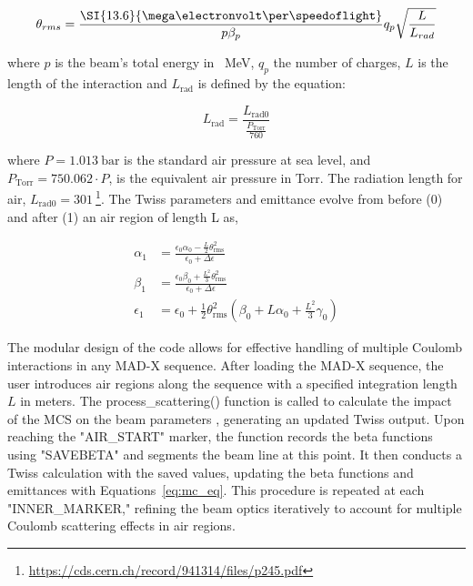\documentclass[a4paper,
               biblatex,     %
               ]{jacow}
\begin{document}
\[
\theta_{rms} = \frac{\SI{13.6}{\mega\electronvolt\per\speedoflight}}{p\beta_{p}}q_{p}\sqrt\frac{L}{L_{rad}}\]

\noindent where $p$ is the beam's total energy in \SI{}{\mega\electronvolt}, $q_{p}$ the number of charges, $L$ is the length of the interaction and $L_{\text{rad}}$ is defined by the equation:

\[
L_{\text{rad}} = \frac{L_{\text{rad0}}}{\frac{P_{\text{Torr}}}{760}}
\]

\noindent where $P=\SI{1.013}{\bar}$ is the standard air pressure at sea level, and $P_{\text{Torr}} = 750.062\cdot P$, is the equivalent air pressure in Torr. The radiation length for air, $L_{\text{rad0}}=\SI{301}{}$\footnote{\href{https://cds.cern.ch/record/941314/files/p245.pdf}{{https://cds.cern.ch/record/941314/files/p245.pdf}}}. The Twiss parameters and emittance evolve from before (0) and after (1) an air region of length L as,


\begin{equation}
\label{eq:mc_eq}
\begin{aligned}
\alpha_{1} &= \frac{\epsilon_0 \alpha_0 - \frac{L}{2} \theta_{\text{rms}}^2}{\epsilon_0 + \Delta \epsilon}\\
\beta_{1} &= \frac{\epsilon_0 \beta_0 + \frac{L^2}{3} \theta_{\text{rms}}^2}{\epsilon_0 + \Delta \epsilon}\\
\epsilon_{1} &= \epsilon_0 + \frac{1}{2} \theta_{\text{rms}}^2 \left( \beta_0 + L \alpha_0 + \frac{L^2}{3} \gamma_0 \right)
\end{aligned}
\end{equation}

The modular design of the code allows for effective handling of multiple Coulomb interactions in any MAD-X sequence. After loading the MAD-X sequence, the user introduces air regions along the sequence with a specified integration length $L$ in meters. The process\_scattering() function is called to calculate the impact of the MCS on the beam parameters , generating an updated Twiss output. Upon reaching the "AIR\_START" marker, the function records the beta functions using "SAVEBETA" and segments the beam line at this point. It then conducts a Twiss calculation with the saved values, updating the beta functions and emittances with Equations~\ref{eq:mc_eq}. This procedure is repeated at each "INNER\_MARKER," refining the beam optics iteratively to account for multiple Coulomb scattering effects in air regions.
\end{document}
